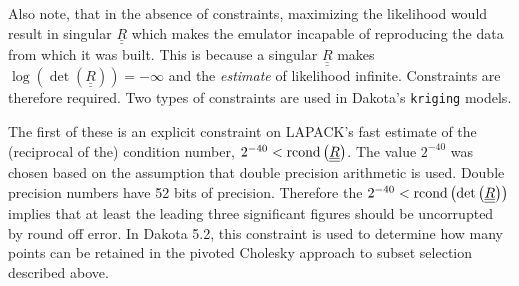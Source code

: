 Also note, that in the absence of constraints, maximizing the likelihood 
would result in singular $\underline{\underline{R}}$ which makes the 
emulator incapable of reproducing the data from which it was built.  
This is because a singular $\underline{\underline{R}}$ makes  
$\log\left(\det\left(\underline{\underline{R}}\right)\right)=-\infty$
and the {\it estimate} of likelihood infinite.  Constraints are therefore 
required.  Two types of constraints are used in Dakota's \texttt{kriging}
models.\newline

The first of these is an explicit constraint on LAPACK's fast
estimate of the (reciprocal of the) condition number, 
$2^{-40}<{\rm rcond}\left(\underline{\underline{R}}\right)$.  The value $2^{-40}$ was chosen based on the assumption that double
precision arithmetic is used.  Double precision numbers have 52 bits of 
precision. Therefore the  
$2^{-40}<{\rm rcond}\left(\det\left(\underline{\underline{R}}\right)\right)$ implies that at least the leading three significant figures should be 
uncorrupted by round off error.  In Dakota 5.2, this constraint is used
to determine how many points can be retained in the pivoted Cholesky 
approach to subset selection described above.\newline

